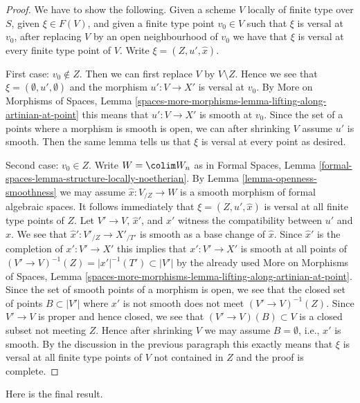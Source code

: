 \begin{proof}
We have to show the following. Given a scheme $V$ locally of finite type over
$S$, given $\xi \in F(V)$, and given a finite type point $v_0 \in V$ such that
$\xi$ is versal at $v_0$, after replacing $V$ by an open neighbourhood
of $v_0$ we have that $\xi$ is versal at every finite type point of $V$.
Write $\xi = (Z, u', \hat x)$.

\medskip\noindent
First case: $v_0 \not \in Z$. Then we can first replace $V$ by
$V \setminus Z$. Hence we see that $\xi = (\emptyset, u', \emptyset)$
and the morphism $u' : V \to X'$ is versal at $v_0$.
By More on Morphisms of Spaces, Lemma
\ref{spaces-more-morphisms-lemma-lifting-along-artinian-at-point}
this means that $u' : V \to X'$ is smooth at $v_0$.
Since the set of a points where a morphism is smooth is open,
we can after shrinking $V$ assume $u'$ is smooth.
Then the same lemma tells us that $\xi$ is versal at every
point as desired.

\medskip\noindent
Second case: $v_0 \in Z$. Write $W = \colim W_n$ as in
Formal Spaces, Lemma \ref{formal-spaces-lemma-structure-locally-noetherian}.
By Lemma \ref{lemma-openness-smoothness} we may assume $\hat x : V_{/Z} \to W$
is a smooth morphism of formal algebraic spaces. It follows immediately
that $\xi = (Z, u', \hat x)$ is versal at all finite type points of $Z$.
Let $V' \to V$, $\hat x'$, and $x'$ witness the compatibility between $u'$
and $\hat x$. We see that $\hat x' : V'_{/Z} \to X'_{/T'}$ is smooth as a
base change of $\hat x$. Since $\hat x'$ is the completion of
$x' : V' \to X'$ this implies that $x' : V' \to X'$ is smooth at all
points of $(V' \to V)^{-1}(Z) = |x'|^{-1}(T') \subset |V'|$
by the already used More on Morphisms of Spaces, Lemma
\ref{spaces-more-morphisms-lemma-lifting-along-artinian-at-point}.
Since the set of smooth points of a morphism is open, we see that
the closed set of points $B \subset |V'|$ where $x'$ is not smooth
does not meet $(V' \to V)^{-1}(Z)$. Since $V' \to V$ is proper and
hence closed, we see that $(V' \to V)(B) \subset V$ is a closed
subset not meeting $Z$. Hence after shrinking $V$ we may assume
$B = \emptyset$, i.e., $x'$ is smooth. By the discussion in the previous
paragraph this exactly means that $\xi$ is versal at all finite type
points of $V$ not contained in $Z$ and the proof is complete.
\end{proof}

\noindent
Here is the final result.


